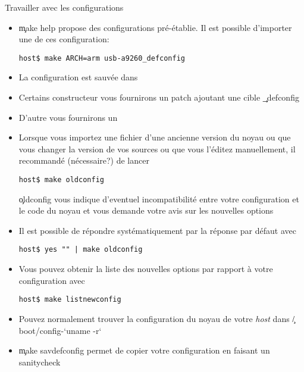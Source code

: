 \begin{frame}[fragile=singleslide]{Travailler avec les configurations}
  \begin{itemize} 
  \item \c{make  help} propose des configurations  pré-établie. Il est
    possible d'importer une de ces configuration:
    \begin{lstlisting} 
host$ make ARCH=arm usb-a9260_defconfig
    \end{lstlisting} 
  \item La configuration est sauvée dans 
  \item Certains  constructeur vous  fournirons un patch  ajoutant une
    cible \c{_defconfig}
  \item D'autre vous fournirons un 
  \item  Lorsque  vous   importez  une  fichier    d'une
    ancienne version  du noyau ou que  vous changer la  version de vos
    sources   ou  que  vous   l'éditez  manuellement,   il  recommandé
    (nécessaire?) de lancer
    \begin{lstlisting} 
host$ make oldconfig
    \end{lstlisting} 
    \c{oldconfig} vous indique  d'eventuel incompatibilité entre votre
    configuration et le  code du noyau et vous  demande votre avis sur
    les nouvelles options
  \item Il  est possible de  répondre systématiquement par  la réponse
    par défaut avec
    \begin{lstlisting} 
host$ yes "" | make oldconfig
    \end{lstlisting} 
  \item Vous pouvez obtenir la liste des nouvelles options par rapport
    à votre configuration avec
   \begin{lstlisting} 
host$ make listnewconfig
   \end{lstlisting} 
 \item Pouvez  normalement trouver la configuration du  noyau de votre
   \emph{host} dans \c{/boot/config-`uname -r`}
 \item \c{make  savdefconfig} permet de copier  votre configuration en
   faisant un sanitycheck
 \end{itemize}
\end{frame} 

